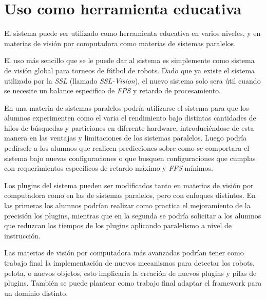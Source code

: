 
\section{Uso como herramienta educativa}

\label{usoEducativo}

El sistema puede ser utilizado como herramienta educativa en varios niveles, y
en materias de visión por computadora como materias de sistemas paralelos.

El uso más sencillo que se le puede dar al sistema es simplemente como sistema
de visión global para torneos de fútbol de robots. Dado que ya existe el sistema
utilizado por la \emph{SSL} (llamado \emph{SSL-Vision}), el nuevo sistema solo
sera útil cuando se necesite un balance especifico de \emph{FPS} y retardo de
procesamiento.

En una materia de sistemas paralelos podría utilizarse el sistema para que los
alumnos experimenten como el varia el rendimiento bajo distintas cantidades de
hilos de búsquedas y particiones en diferente hardware, introduciéndose de esta
manera en las ventajas y limitaciones de los sistemas paralelos. Luego podría
pedírsele a los alumnos que realicen predicciones sobre como se comportara el
sistema bajo nuevas configuraciones o que busquen configuraciones que cumplas
con requerimientos específicos de retardo máximo y \emph{FPS} mínimos.

Los plugins del sistema pueden ser modificados tanto en materias de visión por
computadora como en las de sistemas paralelos, pero con enfoques distintos. En
las primeras los alumnos podrían realizar como practica el mejoramiento de la
precisión los plugins, mientras que en la segunda se podría solicitar a los
alumnos que reduzcan los tiempos de los plugins aplicando paralelismo a nivel de
instrucción.

Las materias de visión por computadora más avanzadas podrían tener como trabajo
final la implementación de nuevos mecanismos para detectar los robots, pelota, o
nuevos objetos, esto implicaría la creación de nuevos plugins y pilas de
plugins. También se puede plantear como trabajo final adaptar el framework para
un dominio distinto.
